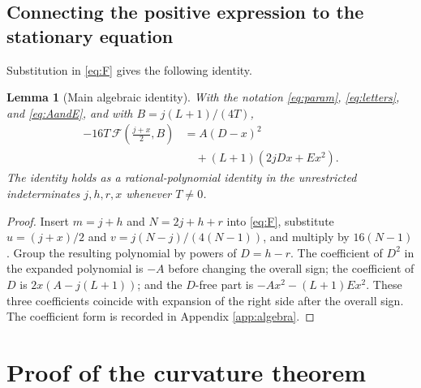 \documentclass[11pt,a4paper]{article}
\newtheorem{lemma}[theorem]{Lemma}
\begin{document}
\subsection{Connecting the positive expression to the stationary equation}
Substitution in \eqref{eq:F} gives the following identity.
\begin{lemma}[Main algebraic identity]\label{lem:identity}
With the notation \eqref{eq:param}, \eqref{eq:letters}, and \eqref{eq:AandE}, and with $B=j(L+1)/(4T)$,
\begin{equation}\label{eq:exactidentity}
 \boxed{\begin{aligned}
 -16T\,\mathcal F\left(\frac{j+x}{2},B\right)
 & =A(D-x)^2\\
 &\quad+(L+1)(2jDx+Ex^2).
 \end{aligned}}
\end{equation}
The identity holds as a rational-polynomial identity in the unrestricted indeterminates $j,h,r,x$ whenever $T\ne0$.
\end{lemma}
\begin{proof}
Insert $m=j+h$ and $N=2j+h+r$ into \eqref{eq:F}, substitute $u=(j+x)/2$ and $v=j(N-j)/(4(N-1))$, and multiply by $16(N-1)$. Group the resulting polynomial by powers of $D=h-r$. The coefficient of $D^2$ in the expanded polynomial is $-A$ before changing the overall sign; the coefficient of $D$ is $2x(A-j(L+1))$; and the $D$-free part is $-Ax^2-(L+1)Ex^2$. These three coefficients coincide with expansion of the right side after the overall sign. The coefficient form is recorded in Appendix \ref{app:algebra}.
\end{proof}

\section{Proof of the curvature theorem}\label{sec:proof}
\end{document}
